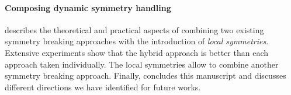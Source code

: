 \paragraph{Composing dynamic symmetry handling}
 describes the theoretical and practical aspects of combining two existing
symmetry  breaking approaches with the introduction of \textit{local symmetries}.
 Extensive experiments show that the hybrid approach is better than 
each approach taken individually. The local symmetries allow to combine another 
symmetry breaking approach.
Finally,  concludes this manuscript and discusses different directions we have identified for future works.
 
